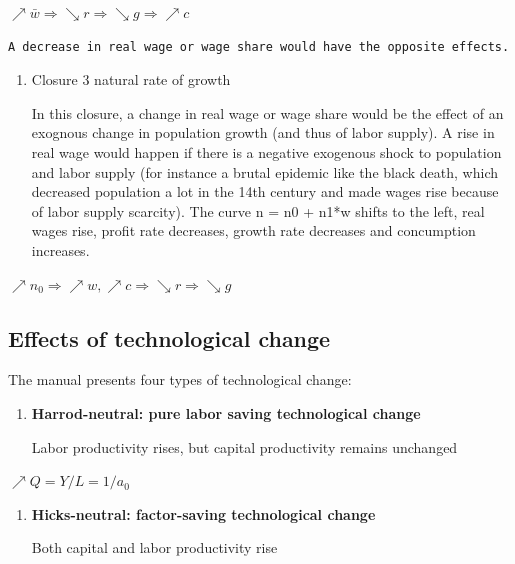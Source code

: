 \documentclass[
  letterpaper,
  DIV=11,
  numbers=noendperiod]{scrreprt}
\begin{document}
\(\nearrow \bar{w} \Rightarrow \searrow r \Rightarrow \searrow g \Rightarrow \nearrow c\)

\begin{verbatim}
A decrease in real wage or wage share would have the opposite effects.
\end{verbatim}

\begin{enumerate}
\def\labelenumi{\arabic{enumi}.}
\setcounter{enumi}{1}
\item
  Closure 3 natural rate of growth

  In this closure, a change in real wage or wage share would be the
  effect of an exognous change in population growth (and thus of labor
  supply). A rise in real wage would happen if there is a negative
  exogenous shock to population and labor supply (for instance a brutal
  epidemic like the black death, which decreased population a lot in the
  14th century and made wages rise because of labor supply scarcity).
  The curve n = n0 + n1*w shifts to the left, real wages rise, profit
  rate decreases, growth rate decreases and concumption increases.
\end{enumerate}

\(\nearrow n_0 \Rightarrow \nearrow w, \nearrow c \Rightarrow \searrow r \Rightarrow \searrow g\)

\hypertarget{effects-of-technological-change}{%
\subsection{Effects of technological
change}\label{effects-of-technological-change}}

The manual presents four types of technological change:

\begin{enumerate}
\def\labelenumi{\arabic{enumi}.}
\item
  \textbf{Harrod-neutral: pure labor saving technological change}

  Labor productivity rises, but capital productivity remains unchanged
\end{enumerate}

\(\nearrow Q = Y/L = 1/a_0\)

\begin{enumerate}
\def\labelenumi{\arabic{enumi}.}
\setcounter{enumi}{1}
\item
  \textbf{Hicks-neutral: factor-saving technological change}

  Both capital and labor productivity rise
\end{enumerate}
\end{document}
